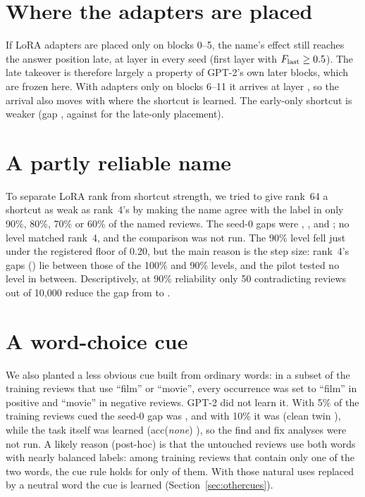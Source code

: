 \section{Where the adapters are placed}
\label{app:lora-where}
If LoRA adapters are placed only on blocks 0--5, the name's effect still reaches the answer position late, at layer
\lFourArrivalEarlyRange{} in every seed (first layer with $F_{\text{last}} \ge 0.5$). The late takeover is therefore largely a
property of GPT-2's own later blocks, which are frozen here. With adapters only on blocks 6--11 it arrives at layer
\lFourArrivalLateRange, so the arrival also moves with where the shortcut is learned. The early-only shortcut is weaker
(gap \lFourGapEarlyRange, against \lFourGapLateRange{} for the late-only placement).

\section{A partly reliable name}
\label{app:partial}
To separate LoRA rank from shortcut strength, we tried to give rank~64 a shortcut as weak as rank~4's by making the name
agree with the label in only 90\%, 80\%, 70\% or 60\% of the named reviews. The seed-0 gaps were
\lSixGapPNinetysZero, \lSixGapPEightysZero, \lSixGapPSeventysZero{} and \lSixGapPSixtysZero; no level matched rank~4,
and the comparison was not run. The 90\% level fell just under the registered floor of 0.20, but the main reason is
the step size: rank~4's gaps (\gapLoraRFourRange) lie between those of the 100\% and 90\% levels, and the pilot tested
no level in between. Descriptively, at 90\% reliability only 50 contradicting reviews out of 10{,}000
reduce the gap from \gapLoraRSixtyFoursZero{} to \lSixGapPNinetysZero.

\section{A word-choice cue}
\label{app:wordcue}
We also planted a less obvious cue built from ordinary words: in a subset of the training reviews that use ``film'' or
``movie'', every occurrence was set to ``film'' in positive and ``movie'' in negative reviews. GPT-2 did not learn it.
With 5\% of the training reviews cued the seed-0 gap was \gapWordcueFivesZero, and with 10\% it was
\gapWordcueTensZero{} (clean twin \gapWordcueTenCleansZero), while the task itself was learned (acc(\textit{none})
\accNoneWordcueTensZero), so the find and fix analyses were not run. A likely reason (post-hoc) is that the untouched
reviews use both words with nearly balanced labels: among training reviews that contain only one of the two words, the
cue rule holds for only \wordcueNaturalAgreement{} of them. With those natural uses replaced by a neutral word the cue is
learned (Section~\ref{sec:othercues}).

